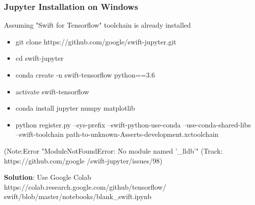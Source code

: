\begin{frame} \frametitle{Jupyter Installation on Windows}

Assuming "Swift for Tensorflow" toolchain is already installed

\begin{itemize}
\item git clone https://github.com/google/swift-jupyter.git
\item cd swift-jupyter
\item conda create -n swift-tensorflow python==3.6
\item activate swift-tensorflow
\item conda install jupyter numpy matplotlib
\item python register.py --sys-prefix --swift-python-use-conda --use-conda-shared-libs --swift-toolchain path-to-unknown-Asserts-development.xctoolchain
\end{itemize}

{\tiny (Note:Error "ModuleNotFoundError: No module named '\_lldb'" (Track: https://github.com/google /swift-jupyter/issues/98)}
 
{\bf Solution}: Use Google Colab https://colab.research.google.com/github/tensorflow/ swift/blob/master/notebooks/blank\_swift.ipynb
\end{frame}